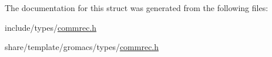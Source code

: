 \-The documentation for this struct was generated from the following files\-:\begin{DoxyCompactItemize}
\item 
include/types/\hyperlink{include_2types_2commrec_8h}{commrec.\-h}\item 
share/template/gromacs/types/\hyperlink{share_2template_2gromacs_2types_2commrec_8h}{commrec.\-h}\end{DoxyCompactItemize}
